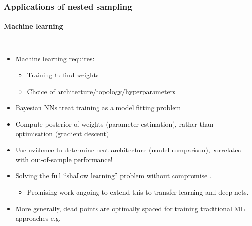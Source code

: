 \documentclass[aspectratio=169]{beamer}
\begin{document}
\begin{frame}
\begin{columns}
    \end{columns}
\end{frame}
\begin{frame}
    \frametitle{Applications of nested sampling}
    \framesubtitle{Machine learning}
    \begin{columns}
        \begin{itemize}
            \item Machine learning requires:
                \begin{itemize}
                    \item Training to find weights
                    \item Choice of architecture/topology/hyperparameters
                \end{itemize}
            \item Bayesian NNs treat training as a model fitting problem
            \item Compute posterior of weights (parameter estimation), rather than optimisation (gradient descent)
            \item Use evidence to determine best architecture (model comparison), correlates with out-of-sample performance! 
            \item Solving the full ``shallow learning'' problem without compromise . 
                \begin{itemize}
                    \item Promising work ongoing to extend this to transfer learning and deep nets.
                \end{itemize}
            \item More generally, dead points are optimally spaced  for training traditional ML approaches e.g. 
        \end{itemize}

\end{columns}
\end{frame}
\end{document}
